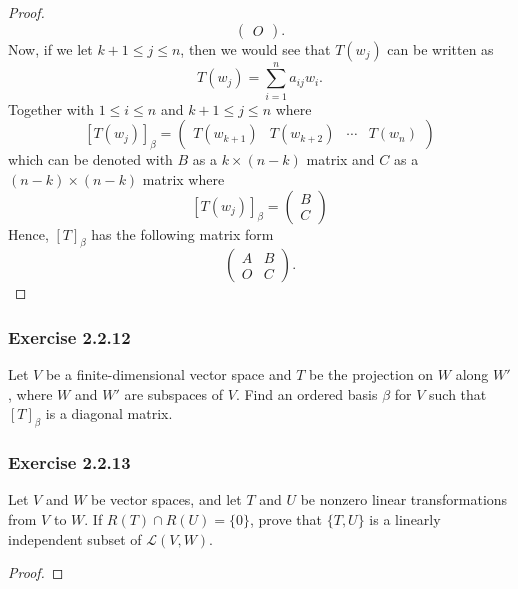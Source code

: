 \begin{proof}
\[\begin{pmatrix}
        O 
    \end{pmatrix}. \]
    Now, if we let \( k + 1 \leq j \leq n \), then we would see that \( T({w}_{j}) \) can be written as 
    \[  T({w}_{j}) = \sum_{ i=1 }^{ n } {a}_{ij} {w}_{i}. \]
Together with \( 1 \leq i \leq n  \) and \( k+1 \leq j \leq n   \) where 
\[  [T({w}_{j})]_{\beta} = \begin{pmatrix}
    T({w}_{k+1}) & T({w}_{k+2}) & \cdots & T({w}_{n})
\end{pmatrix}  \]
which can be denoted with \( B  \) as a \( k \times (n-k)  \) matrix and \( C  \) as a \( (n-k) \times (n-k)  \) matrix where  
    \[ 
        [T({w}_{j})]_{\beta} = \begin{pmatrix}
            B \\
            C
        \end{pmatrix}
    \]
Hence, \( {[T]}_{\beta} \) has the following matrix form
\[  \begin{pmatrix}
    A & B \\
    O & C 
\end{pmatrix}. \]
 \end{proof}

\subsubsection{Exercise 2.2.12} Let \( V  \) be a finite-dimensional vector space and \( T \) be the projection on \( W  \) along \( W' \), where \( W  \) and \( W'  \) are subspaces of \( V  \). Find an ordered basis \( \beta  \) for \( V  \) such that \( [T]_{\beta}^{}   \) is a diagonal matrix.
\begin{solution}

\end{solution}

\subsubsection{Exercise 2.2.13} Let \( V  \) and \( W  \) be vector spaces, and let \( T  \) and \( U  \) be nonzero linear transformations from \( V  \) to \( W  \). If \( R(T) \cap R(U) = \{ 0  \}   \), prove that \( \{ T, U  \}   \) is a linearly independent subset of \( \mathcal{L}(V, W ) \).
\begin{proof}

\end{proof}

